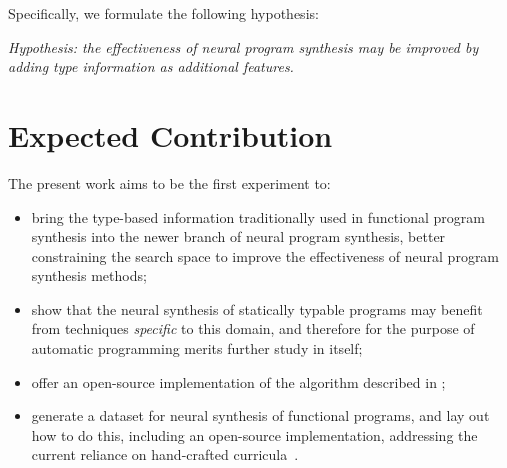 \documentclass{article}
\begin{document}
Specifically, we formulate the following hypothesis:
\begin{displayquote} %
    \emph{
        Hypothesis:
        the effectiveness of neural program synthesis may be improved by
        adding type information as additional features.
    }
\end{displayquote}




\section{Expected Contribution} %

The present work aims to be the first experiment to:
\begin{itemize}
    \item bring the type-based information traditionally used in functional program synthesis into the newer branch of neural program synthesis,
    better constraining the search space to improve the effectiveness of neural program synthesis methods;
    \item show that the neural synthesis of statically typable programs may benefit from techniques \emph{specific} to this domain, and therefore for the purpose of automatic programming merits further study in itself;
    \item offer an open-source implementation of the algorithm described in \citet{nsps};
    \item generate a dataset for neural synthesis of functional programs, and lay out how to do this, including an open-source implementation, addressing the current reliance on hand-crafted curricula~\citep{nps}.
\end{itemize}
\end{document}

